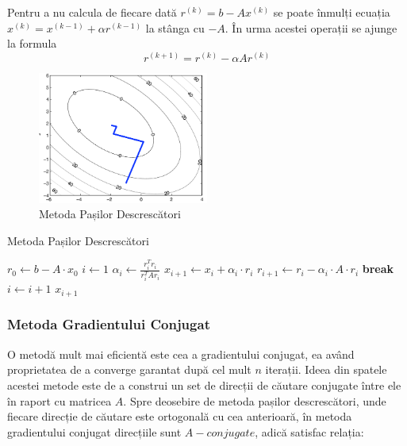 \documentclass{exam}
\begin{document}
Pentru a nu calcula de fiecare dată $r^{(k)} = b - Ax^{(k)}$ se poate înmulți ecuația $x^{(k)} = x^{(k-1)} + \alpha r^{(k-1)}$ la stânga cu $-A$. În urma acestei operații se ajunge la formula $$r^{(k+1)} = r^{(k)} - \alpha Ar^{(k)}$$
\begin{figure}[H]
	\centering
	\includegraphics[width=0.5\textwidth]{lab6/img/steepest_descent.png}
	\caption{Metoda Pașilor Descrescători}
	\label{fig:1}
\end{figure}

\begin{algorithm}[H]
    \caption{Metoda Pașilor Descrescători}
    \begin{algorithmic}[1]
        \State $r_0 \gets b - A \cdot x_0$ 
        \State $i \gets 1$
            \State $\alpha_i \gets \frac{r_i^T r_i}{r_i^T A r_i}$ 
            \State $x_{i+1} \gets x_i + \alpha_i \cdot r_i$ 
            \State $r_{i+1} \gets r_i - \alpha_i \cdot A \cdot r_i$ 
                \State \textbf{break}
            \EndIf
            \State $i \gets i + 1$
        \EndWhile
        \State \Return $x_{i+1}$
    \end{algorithmic}
\end{algorithm}

\subsubsection{Metoda Gradientului Conjugat}

O metodă mult mai eficientă este cea a gradientului conjugat, ea având proprietatea de a converge garantat după cel mult $n$ iterații. Ideea din spatele acestei metode este de a construi un set de direcții de căutare conjugate între ele în raport cu matricea $A$. Spre deosebire de metoda pașilor descrescători, unde fiecare direcție de căutare este ortogonală cu cea anterioară, în metoda gradientului conjugat direcțiile sunt $A-conjugate$, adică satisfac relația:
\end{document}
